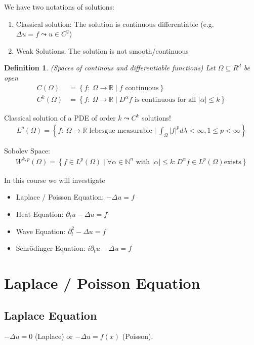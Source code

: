 \documentclass{report}
\theoremstyle{tommy}
\newtheorem{defn}{Definition}
\begin{document}
We have two notations of solutions:
\begin{enumerate}
  \item Classical solution: The solution is continuous differentiable (e.g. \( \Delta u = f  \leadsto u \in C^2  \))
  \item Weak Solutions: The solution is not smooth/continuous
\end{enumerate}

\begin{defn} (Spaces of continous and differentiable functions)
  Let \(\Omega \subseteq R^d\) be open
  \begin{align*}
    C(\Omega) &= \left\{ f: \ \Omega \to \mathbb{R} \mid f \text{ continuous} \right\} \\
    C^k(\Omega) &= \left\{ f: \ \Omega \to \mathbb{R} \mid D^\alpha f \text{ is continuous for all } |\alpha| \le k \right\}
  \end{align*}
\end{defn}

Classical solution of a PDE of order \(k \leadsto C^k\) solutions!
\begin{align*}
  L^p(\Omega) = \left\{ f: \ \Omega \to \mathbb{R} \text{ lebesgue measurable} \mid \int_\Omega |f|^p d\lambda < \infty, 1 \le p < \infty \right\}
\end{align*}

Sobolev Space:
\begin{align*}
  W^{k,p}(\Omega)= \left \{ f \in L^p(\Omega) \mid \forall \alpha \in \mathbb{N}^n \text{ with } |\alpha| \leq k: D^{\alpha}f \in L^p(\Omega) \text{exists}  \right \}
\end{align*}

In this course we will investigate
\begin{itemize}
  \item Laplace / Poisson Equation: \(-\Delta u = f\)
  \item Heat Equation: \(\partial_t u - \Delta u = f\)
  \item Wave Equation: \(\partial_t^2 - \Delta u = f\)
  \item Schrödinger Equation: \(i \partial_t u - \Delta u = f\)
\end{itemize}


\chapter{Laplace / Poisson Equation}

\section{Laplace Equation}
\(- \Delta u = 0\) (Laplace) or \(-\Delta u = f(x)\) (Poisson).
\end{document}
